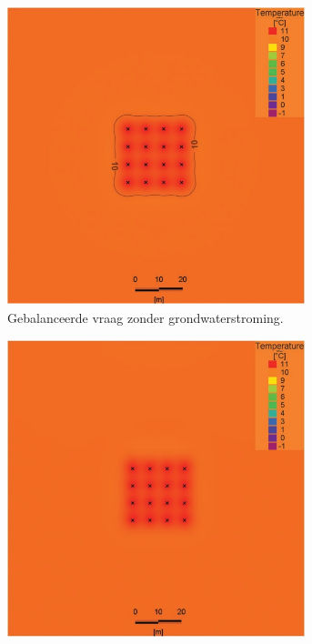 \documentclass[a4paper,oneside,11pt]{report}
\numberwithin{figure}{section}
\numberwithin{table}{section}
\numberwithin{equation}{section}
\begin{document}
\begin{figure}[hbtp] 
\begin{subfigure}{0.4\textwidth}
	\centering
	\includegraphics[width=0.95\textwidth]{invlf_fig7a.jpg}
	\caption[width=0.95\textwidth]{Gebalanceerde vraag zonder grondwaterstroming.}
\end{subfigure}%
\begin{subfigure}{0.4\textwidth}
	\centering
	\includegraphics[width=0.95\textwidth]{invlf_fig7b.jpg}

\end{subfigure}
\end{figure}
\end{document}
